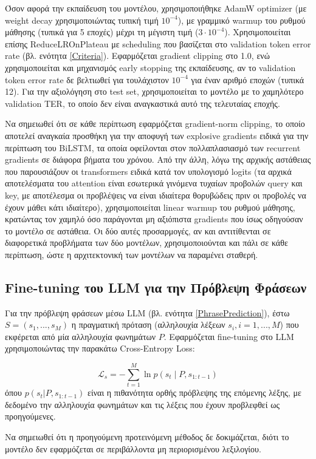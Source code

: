 Όσον αφορά την εκπαίδευση του μοντέλου, χρησιμοποιήθηκε AdamW optimizer (με weight decay χρησιμοποιώντας τυπική τιμή $10^{-4}$), με γραμμικό warmup του ρυθμού μάθησης (τυπικά για 5 εποχές) μέχρι τη μέγιστη τιμή ($3\cdot10^{-4}$). Χρησιμοποιείται επίσης ReduceLROnPlateau με scheduling που βασίζεται στο validation token error rate (βλ. ενότητα \ref{Criteria}). Εφαρμόζεται gradient clipping στο 1.0, ενώ χρησιμοποιείται και μηχανισμός early stopping της εκπαίδευσης, αν το validation token error rate δε βελτιωθεί για τουλάχιστον $10^{-4}$ για έναν αριθμό εποχών (τυπικά 12). Για την αξιολόγηση στο test set, χρησιμοποιείται το μοντέλο με το χαμηλότερο validation TER, το οποίο δεν είναι αναγκαστικά αυτό της τελευταίας εποχής.

Να σημειωθεί ότι σε κάθε περίπτωση εφαρμόζεται gradient-norm clipping, το οποίο αποτελεί αναγκαία προσθήκη για την αποφυγή των explosive gradients ειδικά για την περίπτωση του BiLSTM, τα οποία οφείλονται στον πολλαπλασιασμό των recurrent gradients σε διάφορα βήματα του χρόνου. Από την άλλη, λόγω της αρχικής αστάθειας που παρουσιάζουν οι transformers ειδικά κατά τον υπολογισμό logits (τα αρχικά αποτελέσματα του attention είναι εσωτερικά γινόμενα τυχαίων προβολών query και key, με αποτέλεσμα οι προβλέψεις να είναι ιδιαίτερα θορυβώδεις πριν οι προβολές να έχουν μάθει κάτι ιδιαίτερο), χρησιμοποιείται linear warmup του ρυθμού μάθησης, κρατώντας τον χαμηλό όσο παράγονται μη αξιόπιστα gradients που ίσως οδηγούσαν το μοντέλο σε αστάθεια. Οι δύο αυτές προσαρμογές, αν και αντιτίθενται σε διαφορετικά προβλήματα των δύο μοντέλων, χρησιμοποιούνται και πάλι σε κάθε περίπτωση, ώστε η αρχιτεκτονική των μοντέλων να παραμένει σταθερή.

\subsection{Fine-tuning του LLM για την Πρόβλεψη Φράσεων}
\label{LLMFineTuning}

Για την πρόβλεψη φράσεων μέσω LLM (βλ. ενότητα \ref{PhrasePrediction}), έστω $S = (s_1, ..., s_M)$ η πραγματική πρόταση (αλληλουχία λέξεων $s_i, i=1,...,M$) που εκφέρεται από μία αλληλουχία φωνημάτων $P$. Εφαρμόζεται fine-tuning στο LLM χρησιμοποιώντας την παρακάτω Cross-Entropy Loss:

\[
\mathcal{L}_s = - \sum_{t=1}^{M} \ln p(s_t \mid P, s_{1:t-1})
\]
όπου $p(s_t|P, s_{1:t-1})$ είναι η πιθανότητα ορθής πρόβλεψης της επόμενης λέξης, με δεδομένο την αλληλουχία φωνημάτων και τις λέξεις που έχουν προβλεφθεί ως προηγούμενες.

Να σημειωθεί ότι η προηγούμενη προτεινόμενη μέθοδος δε δοκιμάζεται, διότι το μοντέλο δεν εφαρμόζεται σε περιβάλλοντα μη περιορισμένου λεξιλογίου.
